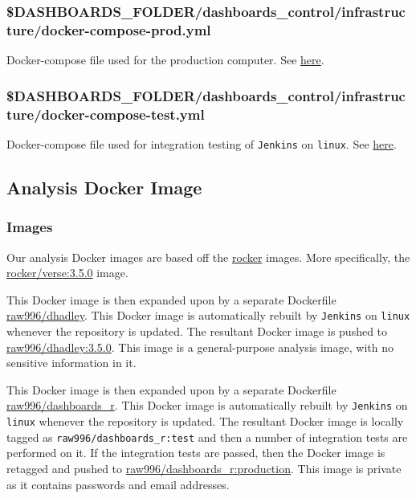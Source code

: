 \documentclass[12pt,]{article}
\begin{document}
\subsubsection{\$DASHBOARDS\_FOLDER/dashboards\_control/infrastructure/docker-compose-prod.yml}\label{dashboards_folderdashboards_controlinfrastructuredocker-compose-prod.yml}

Docker-compose file used for the production computer. See
\protect\hyperlink{dockercompose}{here}.

\subsubsection{\$DASHBOARDS\_FOLDER/dashboards\_control/infrastructure/docker-compose-test.yml}\label{dashboards_folderdashboards_controlinfrastructuredocker-compose-test.yml}

Docker-compose file used for integration testing of \texttt{Jenkins} on
\texttt{linux}. See \protect\hyperlink{dockercompose}{here}.

\hypertarget{analysisdocker}{\subsection{Analysis Docker
Image}\label{analysisdocker}}

\subsubsection{Images}\label{images}

Our analysis Docker images are based off the
\href{https://rocker-project.org}{rocker} images. More specifically, the
\href{https://hub.docker.com/r/rocker/verse/}{rocker/verse:3.5.0} image.

This Docker image is then expanded upon by a separate Dockerfile
\href{https://github.com/raubreywhite/docker/blob/master/dhadley/Dockerfile}{raw996/dhadley}.
This Docker image is automatically rebuilt by \texttt{Jenkins} on
\texttt{linux} whenever the repository is updated. The resultant Docker
image is pushed to
\href{https://hub.docker.com/r/raw996/dhadley/}{raw996/dhadley:3.5.0}.
This image is a general-purpose analysis image, with no sensitive
information in it.

This Docker image is then expanded upon by a separate Dockerfile
\href{https://github.com/raubreywhite/dashboards_control/blob/master/infrastructure/dashboards_r/Dockerfile}{raw996/dashboards\_r}.
This Docker image is automatically rebuilt by \texttt{Jenkins} on
\texttt{linux} whenever the repository is updated. The resultant Docker
image is locally tagged as \texttt{raw996/dashboards\_r:test} and then a
number of integration tests are performed on it. If the integration
tests are passed, then the Docker image is retagged and pushed to
\href{https://hub.docker.com/r/raw996/dashboards_r/}{raw996/dashboards\_r:production}.
This image is private as it contains passwords and email addresses.
\end{document}
